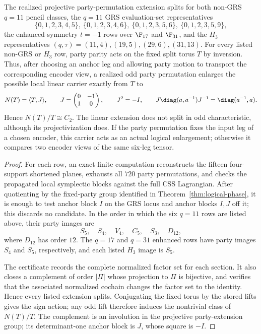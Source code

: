 \begin{corollary}
\label{cor:computed-party-splitting}
The realized projective party-permutation extension splits for both
non-GRS \(q=11\) pencil classes, the \(q=11\) GRS evaluation-set
representatives
\[
\{0,1,2,3,4,5\},\ \{0,1,2,3,4,6\},\
\{0,1,2,3,5,6\},\ \{0,1,2,3,5,9\},
\]
the enhanced-symmetry \(t=-1\) rows over \(\F_{17}\) and \(\F_{31}\),
and the \(H_3\) representatives
\((q,\tau)=(11,4),(19,5),(29,6),(31,13)\).
For every listed non-GRS or \(H_3\) row, party parity acts on the fixed
split torus \(T\) by inversion.  Thus, after choosing an anchor leg and
allowing party motion to transport the corresponding encoder view, a
realized odd party permutation enlarges the possible local linear
carrier exactly from \(T\) to
\[
 N(T)=\langle T,J\rangle,\qquad
 J=\begin{pmatrix}0&-1\\1&0\end{pmatrix},\qquad
 J^2=-I,\qquad J\diag(a,a^{-1})J^{-1}=\diag(a^{-1},a).
\]
Hence \(N(T)/T\cong C_2\).  The linear extension does not split in odd
characteristic, although its projectivization does.  If the party
permutation fixes the input leg of a chosen encoder, this carrier acts
as an actual logical enlargement; otherwise it compares two encoder
views of the same six-leg tensor.
\end{corollary}

\begin{proof}
For each row, an exact finite computation reconstructs the fifteen
four-support shortened planes, exhausts all \(720\) party permutations,
and checks the propagated local symplectic blocks against the full CSS
Lagrangian.  After quotienting by the fixed-party group identified in
Theorem~\ref{thm:logical-phase}, it is enough to test anchor block \(I\)
on the GRS locus and anchor blocks \(I,J\) off it; this discards no
candidate.  In the order in which the six \(q=11\) rows are listed above,
their party images are
\[
 S_5,\quad S_4,\quad V_4,\quad C_5,\quad S_3,\quad D_{12},
\]
where \(D_{12}\) has order \(12\).  The \(q=17\) and \(q=31\)
enhanced rows have party images \(S_4\) and \(S_5\), respectively, and
each listed \(H_3\) image is \(S_5\).

The certificate records the complete normalized factor set for each
section.  It also closes a complement of order \(\lvert\Pi\rvert\) whose
projection to \(\Pi\) is bijective, and verifies that the associated
normalized cochain changes the factor set to the identity.  Hence every
listed extension splits.  Conjugating the fixed torus by the stored lifts
gives the sign action; any odd lift therefore induces the nontrivial
class of \(N(T)/T\).  The complement is an involution in the projective
party-extension group; its determinant-one anchor block is \(J\), whose
square is \(-I\).
\end{proof}

